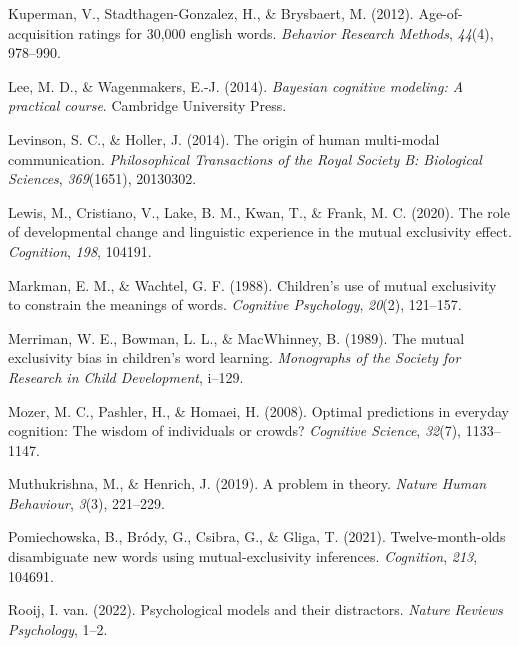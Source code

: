 \documentclass[
  man,floatsintext]{apa6}
\newlength{\cslhangindent}
\newlength{\cslentryspacingunit} %
\newenvironment{CSLReferences}[2] %
 {%
  \setlength{\parindent}{0pt}
  \ifodd #1
  \let\oldpar\par
  \def\par{\hangindent=\cslhangindent\oldpar}
  \fi
  \setlength{\parskip}{#2\cslentryspacingunit}
 }%
 {}
\begin{document}
\begin{CSLReferences}{1}{0}
\leavevmode{}%
Kuperman, V., Stadthagen-Gonzalez, H., \& Brysbaert, M. (2012). Age-of-acquisition ratings for 30,000 english words. \emph{Behavior Research Methods}, \emph{44}(4), 978--990.

\leavevmode{}%
Lee, M. D., \& Wagenmakers, E.-J. (2014). \emph{Bayesian cognitive modeling: A practical course}. Cambridge University Press.

\leavevmode{}%
Levinson, S. C., \& Holler, J. (2014). The origin of human multi-modal communication. \emph{Philosophical Transactions of the Royal Society B: Biological Sciences}, \emph{369}(1651), 20130302.

\leavevmode{}%
Lewis, M., Cristiano, V., Lake, B. M., Kwan, T., \& Frank, M. C. (2020). The role of developmental change and linguistic experience in the mutual exclusivity effect. \emph{Cognition}, \emph{198}, 104191.

\leavevmode{}%
Markman, E. M., \& Wachtel, G. F. (1988). Children's use of mutual exclusivity to constrain the meanings of words. \emph{Cognitive Psychology}, \emph{20}(2), 121--157.

\leavevmode{}%
Merriman, W. E., Bowman, L. L., \& MacWhinney, B. (1989). The mutual exclusivity bias in children's word learning. \emph{Monographs of the Society for Research in Child Development}, i--129.

\leavevmode{}%
Mozer, M. C., Pashler, H., \& Homaei, H. (2008). Optimal predictions in everyday cognition: The wisdom of individuals or crowds? \emph{Cognitive Science}, \emph{32}(7), 1133--1147.

\leavevmode{}%
Muthukrishna, M., \& Henrich, J. (2019). A problem in theory. \emph{Nature Human Behaviour}, \emph{3}(3), 221--229.

\leavevmode{}%
Pomiechowska, B., Bródy, G., Csibra, G., \& Gliga, T. (2021). Twelve-month-olds disambiguate new words using mutual-exclusivity inferences. \emph{Cognition}, \emph{213}, 104691.

\leavevmode{}%
Rooij, I. van. (2022). Psychological models and their distractors. \emph{Nature Reviews Psychology}, 1--2.


\end{CSLReferences}
\end{document}
